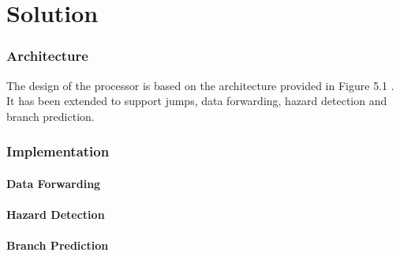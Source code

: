 \chapter{Solution}


\subsection{Architecture}

The design of the processor is based on the architecture provided in Figure 5.1 \cite[p. 50]{compendium}.
It has been extended to support jumps, data forwarding, hazard detection and branch prediction.

\subsection{Implementation}

\subsubsection{Data Forwarding}

\subsubsection{Hazard Detection}

\subsubsection{Branch Prediction}

